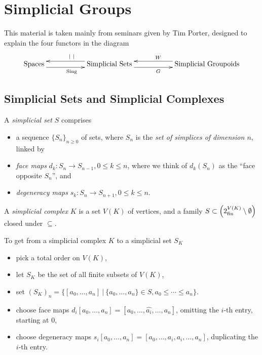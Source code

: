 
\section{Simplicial Groups} \label{sect:simpgps}

This material is taken mainly from seminars given by Tim Porter, 
designed to explain the four functors in the diagram
$$
\xymatrix{
\text{Spaces} \ar[rr]<-1.0ex>_{\Sing}
  && \text{Simplicial Sets} \ar[rr]<-1.0ex>_{G} \ar[ll]<-1.0ex>_{|~|}
     && \text{Simplicial Groupoids} \ar[ll]<-1.0ex>_{W}
}
$$

\bigskip
\subsection{Simplicial Sets and Simplicial Complexes} \label{subsect:simpsets}

A \emph{simplicial set} $S$ comprises 
\begin{itemize}
\item 
a sequence $\{S_n\}_{n \geqslant 0}$ of sets, 
where $S_n$ is the \emph{set of simplices of dimension $n$}, linked by 
\item 
\emph{face maps} $d_k : S_n \to S_{n-1}, 0 \leqslant k \leqslant n$, 
where we think of $d_k(S_n)$ as the ``face opposite $S_n$'', and 
\item
\emph{degeneracy maps} $s_k : S_n \to S_{n+1}, 0 \leqslant k \leqslant n$. 
\end{itemize} 

\noindent
A \emph{simplicial complex} $K$ is a set $V(K)$ of vertices, and a family  
$S \subset \left( 2^{V(K)}_{{\rm fin}} \setminus\emptyset \right)$ 
closed under $\subseteq$. 

\noindent
To get from a simplicial complex $K$ to a simplicial set $S_K$
\begin{itemize}
\item
pick a total order on $V(K)$, 
\item 
let $S_K$ be the set of all finite subsets of $V(K)$, 
\item 
set $(S_K)_n = \{ [a_0,\ldots,a_n] ~|~ \{a_0,\ldots,a_n\} \in S, 
                                       a_0 \leqslant \cdots \leqslant a_n \}$.
\item
choose face maps $d_i[a_0,\ldots,a_n] = [a_0,\ldots,\hat{a_i},\ldots,a_n]$, 
omitting the $i$-th entry, starting at $0$, 
\item
choose degeneracy maps 
$s_i[a_0,\ldots,a_n] = [a_0,\ldots,a_i,a_i,\ldots,a_n]$, 
duplicating the $i$-th entry.
\end{itemize}

